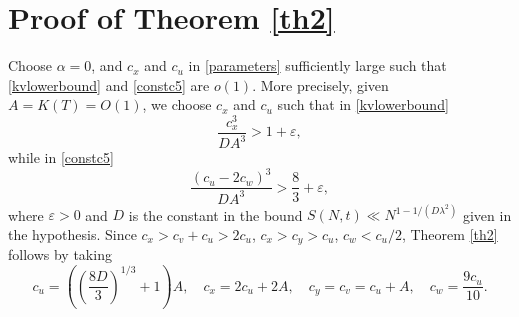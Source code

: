\documentclass[reqno]{amsart}
\numberwithin{equation}{section}
\theoremstyle{remark}
\begin{document}
\section{Proof of Theorem \ref{th2}}
Choose $\alpha=0$, and $c_x$ and $c_u$ in \eqref{parameters} sufficiently large such that \eqref{kvlowerbound} and \eqref{constc5} are $o(1)$. More precisely, given $A=K(T)=O(1)$, we choose $c_x$ and $c_u$ such that in \eqref{kvlowerbound}
$$\frac{c_x^3}{DA^3}>1+\varepsilon,$$
while in \eqref{constc5}
$$\frac{(c_u-2c_w)^3}{DA^3}>\frac{8}{3}+\varepsilon,$$
where $\varepsilon>0$ and $D$ is the constant in the bound $S(N,t)\ll N^{1-1/(D\lambda^2)}$ given in the hypothesis.  
Since $c_x>c_v+c_u>2c_u$, $c_x>c_y>c_u$, $c_w<c_u/2$, Theorem \ref{th2} follows by taking
\begin{equation*}
    c_u=\left(\left(\frac{8D}{3}\right)^{1/3}+1\right)A,\quad c_x=2c_u+2A,\quad c_y=c_v=c_u+A,\quad c_w=\frac{9c_u}{10}.
\end{equation*}
\end{document}
